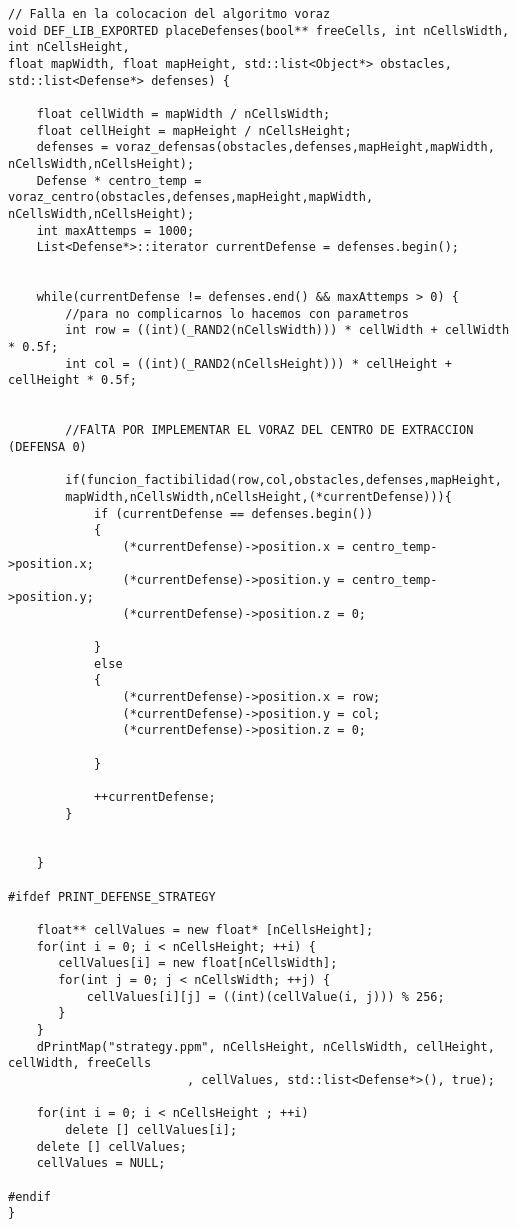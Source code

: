 \begin{lstlisting}
// Falla en la colocacion del algoritmo voraz
void DEF_LIB_EXPORTED placeDefenses(bool** freeCells, int nCellsWidth, int nCellsHeight, 
float mapWidth, float mapHeight, std::list<Object*> obstacles, std::list<Defense*> defenses) {

    float cellWidth = mapWidth / nCellsWidth;
    float cellHeight = mapHeight / nCellsHeight; 
    defenses = voraz_defensas(obstacles,defenses,mapHeight,mapWidth, nCellsWidth,nCellsHeight);
    Defense * centro_temp = voraz_centro(obstacles,defenses,mapHeight,mapWidth, nCellsWidth,nCellsHeight);
    int maxAttemps = 1000;
    List<Defense*>::iterator currentDefense = defenses.begin();
    

    while(currentDefense != defenses.end() && maxAttemps > 0) {
        //para no complicarnos lo hacemos con parametros
        int row = ((int)(_RAND2(nCellsWidth))) * cellWidth + cellWidth * 0.5f;
        int col = ((int)(_RAND2(nCellsHeight))) * cellHeight + cellHeight * 0.5f;
        
        
        //FAlTA POR IMPLEMENTAR EL VORAZ DEL CENTRO DE EXTRACCION (DEFENSA 0)
        
        if(funcion_factibilidad(row,col,obstacles,defenses,mapHeight,
        mapWidth,nCellsWidth,nCellsHeight,(*currentDefense))){
            if (currentDefense == defenses.begin())
            {
                (*currentDefense)->position.x = centro_temp->position.x;
                (*currentDefense)->position.y = centro_temp->position.y;
                (*currentDefense)->position.z = 0;
                    
            }
            else
            {
                (*currentDefense)->position.x = row;
                (*currentDefense)->position.y = col;
                (*currentDefense)->position.z = 0;
            
            }
                
            ++currentDefense;
        }
        
       
    }

#ifdef PRINT_DEFENSE_STRATEGY

    float** cellValues = new float* [nCellsHeight]; 
    for(int i = 0; i < nCellsHeight; ++i) {
       cellValues[i] = new float[nCellsWidth];
       for(int j = 0; j < nCellsWidth; ++j) {
           cellValues[i][j] = ((int)(cellValue(i, j))) % 256;
       }
    }
    dPrintMap("strategy.ppm", nCellsHeight, nCellsWidth, cellHeight, cellWidth, freeCells
                         , cellValues, std::list<Defense*>(), true);

    for(int i = 0; i < nCellsHeight ; ++i)
        delete [] cellValues[i];
	delete [] cellValues;
	cellValues = NULL;

#endif
}
\end{lstlisting}